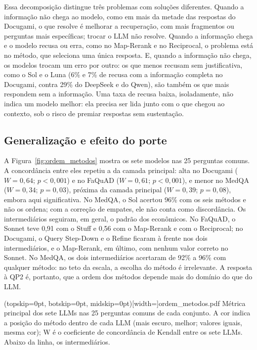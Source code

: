 Essa decomposição distingue três problemas com soluções diferentes. Quando a informação não chega ao modelo, como em mais da metade das respostas do Docugami, o que resolve é melhorar a recuperação, com mais fragmentos ou perguntas mais específicas; trocar o LLM não resolve. Quando a informação chega e o modelo recusa ou erra, como no Map-Rerank e no Reciprocal, o problema está no método, que seleciona uma única resposta. E, quando a informação não chega, os modelos trocam um erro por outro: os que menos recusam sem justificativa, como o Sol e o Luna (6\% e 7\% de recusa com a informação completa no Docugami, contra 29\% do DeepSeek e do Qwen), são também os que mais respondem sem a informação. Uma taxa de recusa baixa, isoladamente, não indica um modelo melhor: ela precisa ser lida junto com o que chegou ao contexto, sob o risco de premiar respostas sem sustentação.

\subsection{Generalização e efeito do porte}
\label{ssc:generalizacao}

A Figura~\ref{fig:ordem_metodos} mostra os sete modelos nas 25 perguntas comuns. A concordância entre eles repetiu a da camada principal: alta no Docugami ($W = 0{,}64$; $p < 0{,}001$) e no FaQuAD ($W = 0{,}61$; $p < 0{,}001$), e menor no MedQA ($W = 0{,}34$; $p = 0{,}03$), próxima da camada principal ($W = 0{,}39$; $p = 0{,}08$), embora aqui significativa. No MedQA, o Sol acertou 96\% com os seis métodos e não os ordena; com a correção de empates, ele não conta como discordância. Os intermediários seguiram, em geral, o padrão dos econômicos. No FaQuAD, o Sonnet teve 0,91 com o Stuff e 0,56 com o Map-Rerank e com o Reciprocal; no Docugami, o Query Step-Down e o Refine ficaram à frente nos dois intermediários, e o Map-Rerank, em último, com nenhum valor correto no Sonnet. No MedQA, os dois intermediários acertaram de 92\% a 96\% com qualquer método: no teto da escala, a escolha do método é irrelevante. A resposta à QP2 é, portanto, que a ordem dos métodos depende mais do domínio do que do LLM.

\Figure[!t](topskip=0pt, botskip=0pt, midskip=0pt)[width=\textwidth]{ordem_metodos.pdf}
{Métrica principal dos sete LLMs nas 25 perguntas comuns de cada conjunto. A cor indica a posição do método dentro de cada LLM (mais escuro, melhor; valores iguais, mesma cor); W é o coeficiente de concordância de Kendall entre os sete LLMs. Abaixo da linha, os intermediários.\label{fig:ordem_metodos}}


